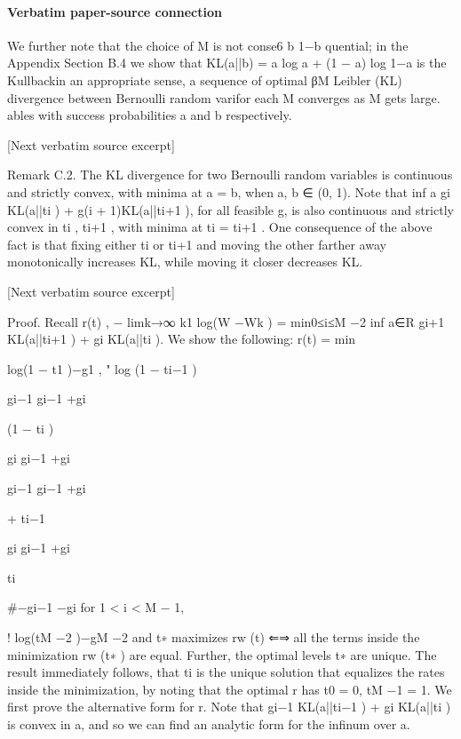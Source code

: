 \documentclass[10pt]{article}
\begin{document}
\paragraph{Verbatim paper-source connection}
\begin{ReviewVerbatim}
We further note that the choice of M is not conse6
b
1−b
quential; in the Appendix Section B.4 we show that
KL(a||b) = a log a + (1 − a) log 1−a is the Kullbackin an appropriate sense, a sequence of optimal βM
Leibler (KL) divergence between Bernoulli random varifor
each M converges as M gets large.
ables with success probabilities a and b respectively.

[Next verbatim source excerpt]

Remark C.2. The KL divergence for two Bernoulli random variables is continuous and strictly
convex, with minima at a = b, when a, b ∈ (0, 1). Note that inf a {gi KL(a||ti ) + g(i + 1)KL(a||ti+1 )},
for all feasible g, is also continuous and strictly convex in ti , ti+1 , with minima at ti = ti+1 .
One consequence of the above fact is that fixing either ti or ti+1 and moving the other farther
away monotonically increases KL, while moving it closer decreases KL.

[Next verbatim source excerpt]

Proof. Recall r(t) , − limk→∞ k1 log(W −Wk ) = min0≤i≤M −2 inf a∈R {gi+1 KL(a||ti+1 ) + gi KL(a||ti )}.
We show the following:
r(t) =
min

log(1 − t1 )−g1 ,
"
log (1 − ti−1 )

gi−1
gi−1 +gi

(1 − ti )

gi
gi−1 +gi

gi−1
gi−1 +gi

+ ti−1

gi
gi−1 +gi

ti

#−gi−1 −gi
for 1 < i < M − 1,

!
log(tM −2 )−gM −2
and t∗ maximizes rw (t) ⇐⇒ all the terms inside the minimization rw (t∗ ) are equal. Further, the
optimal levels t∗ are unique. The result immediately follows, that {ti } is the unique solution that
equalizes the rates inside the minimization, by noting that the optimal r has t0 = 0, tM −1 = 1.
We first prove the alternative form for r. Note that {gi−1 KL(a||ti−1 ) + gi KL(a||ti )} is convex
in a, and so we can find an analytic form for the infinum over a.
\end{ReviewVerbatim}

\end{document}
